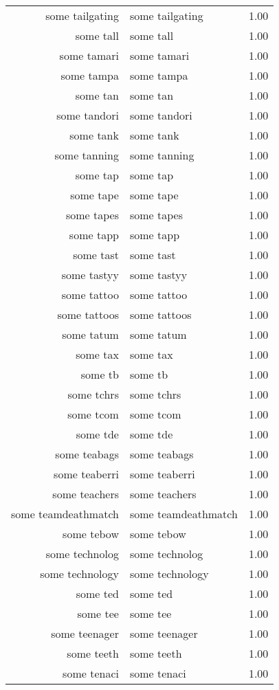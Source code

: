 \begin{table}[ht]
\begin{tabular}{rlr}
  some tailgating & some tailgating & 1.00 \\ 
  some tall & some tall & 1.00 \\ 
  some tamari & some tamari & 1.00 \\ 
  some tampa & some tampa & 1.00 \\ 
  some tan & some tan & 1.00 \\ 
  some tandori & some tandori & 1.00 \\ 
  some tank & some tank & 1.00 \\ 
  some tanning & some tanning & 1.00 \\ 
  some tap & some tap & 1.00 \\ 
  some tape & some tape & 1.00 \\ 
  some tapes & some tapes & 1.00 \\ 
  some tapp & some tapp & 1.00 \\ 
  some tast & some tast & 1.00 \\ 
  some tastyy & some tastyy & 1.00 \\ 
  some tattoo & some tattoo & 1.00 \\ 
  some tattoos & some tattoos & 1.00 \\ 
  some tatum & some tatum & 1.00 \\ 
  some tax & some tax & 1.00 \\ 
  some tb & some tb & 1.00 \\ 
  some tchrs & some tchrs & 1.00 \\ 
  some tcom & some tcom & 1.00 \\ 
  some tde & some tde & 1.00 \\ 
  some teabags & some teabags & 1.00 \\ 
  some teaberri & some teaberri & 1.00 \\ 
  some teachers & some teachers & 1.00 \\ 
  some teamdeathmatch & some teamdeathmatch & 1.00 \\ 
  some tebow & some tebow & 1.00 \\ 
  some technolog & some technolog & 1.00 \\ 
  some technology & some technology & 1.00 \\ 
  some ted & some ted & 1.00 \\ 
  some tee & some tee & 1.00 \\ 
  some teenager & some teenager & 1.00 \\ 
  some teeth & some teeth & 1.00 \\ 
  some tenaci & some tenaci & 1.00 \\ 

\end{tabular}
\end{table}
